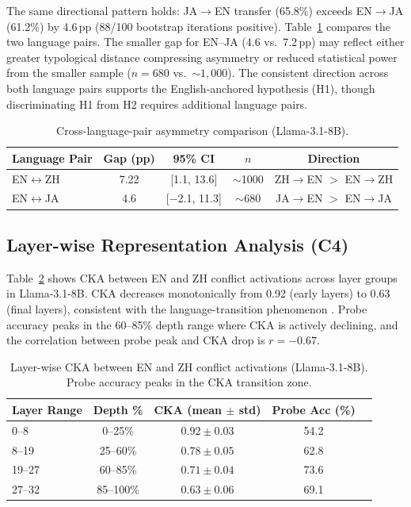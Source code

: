 \documentclass{article}
\begin{document}
The same directional pattern holds: JA$\to$EN transfer (65.8\%) exceeds EN$\to$JA (61.2\%) by 4.6\,pp (88/100 bootstrap iterations positive). Table~\ref{tab:cross-lang} compares the two language pairs. The smaller gap for EN--JA (4.6 vs.\ 7.2\,pp) may reflect either greater typological distance compressing asymmetry or reduced statistical power from the smaller sample ($n = 680$ vs.\ ${\sim}1{,}000$). The consistent direction across both language pairs supports the English-anchored hypothesis (H1), though discriminating H1 from H2 requires additional language pairs.

\begin{table}[t]
\centering
\caption{Cross-language-pair asymmetry comparison (Llama-3.1-8B).}
\label{tab:cross-lang}
\begin{tabular}{lcccc}
\toprule
Language Pair & Gap (pp) & 95\% CI & $n$ & Direction \\
\midrule
EN$\leftrightarrow$ZH & 7.22 & [1.1, 13.6] & $\sim$1000 & ZH$\to$EN $>$ EN$\to$ZH \\
EN$\leftrightarrow$JA & 4.6 & [$-$2.1, 11.3] & $\sim$680 & JA$\to$EN $>$ EN$\to$JA \\
\bottomrule
\end{tabular}
\end{table}

\subsection{Layer-wise Representation Analysis (C4)}
\label{sec:layerwise}

Table~\ref{tab:cka} shows CKA between EN and ZH conflict activations across layer groups in Llama-3.1-8B. CKA decreases monotonically from 0.92 (early layers) to 0.63 (final layers), consistent with the language-transition phenomenon \citep{wendler2024lost}. Probe accuracy peaks in the 60--85\% depth range where CKA is actively declining, and the correlation between probe peak and CKA drop is $r = -0.67$.

\begin{table}[t]
\centering
\caption{Layer-wise CKA between EN and ZH conflict activations (Llama-3.1-8B). Probe accuracy peaks in the CKA transition zone.}
\label{tab:cka}
\begin{tabular}{lcccc}
\toprule
Layer Range & Depth \% & CKA (mean $\pm$ std) & Probe Acc (\%) \\
\midrule
0--8 & 0--25\% & $0.92 \pm 0.03$ & 54.2 \\
8--19 & 25--60\% & $0.78 \pm 0.05$ & 62.8 \\
19--27 & 60--85\% & $0.71 \pm 0.04$ & 73.6 \\
27--32 & 85--100\% & $0.63 \pm 0.06$ & 69.1 \\
\bottomrule
\end{tabular}
\end{table}
\end{document}
